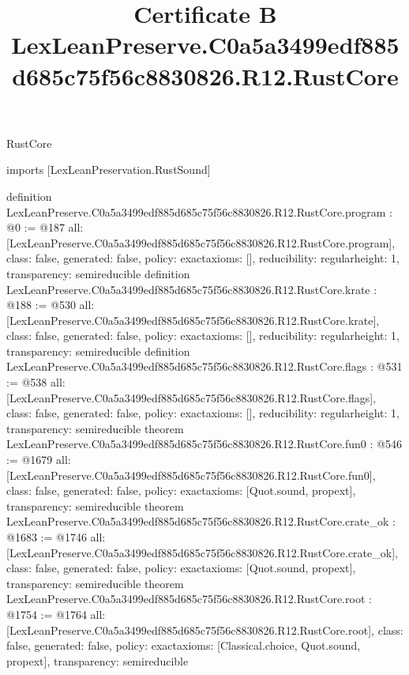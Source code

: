 \begin{lexlean}{RustCore}
\title{Certificate B LexLeanPreserve.C0a5a3499edf885d685c75f56c8830826.R12.RustCore}
\begin{coremodule}
imports [LexLeanPreservation.RustSound]

definition LexLeanPreserve.C0a5a3499edf885d685c75f56c8830826.R12.RustCore.program : @0 := @187 {
  all: [LexLeanPreserve.C0a5a3499edf885d685c75f56c8830826.R12.RustCore.program],
  class: false,
  generated: false,
  policy: exact{axioms: []},
  reducibility: regular{height: 1},
  transparency: semireducible
}
definition LexLeanPreserve.C0a5a3499edf885d685c75f56c8830826.R12.RustCore.krate : @188 := @530 {
  all: [LexLeanPreserve.C0a5a3499edf885d685c75f56c8830826.R12.RustCore.krate],
  class: false,
  generated: false,
  policy: exact{axioms: []},
  reducibility: regular{height: 1},
  transparency: semireducible
}
definition LexLeanPreserve.C0a5a3499edf885d685c75f56c8830826.R12.RustCore.flags : @531 := @538 {
  all: [LexLeanPreserve.C0a5a3499edf885d685c75f56c8830826.R12.RustCore.flags],
  class: false,
  generated: false,
  policy: exact{axioms: []},
  reducibility: regular{height: 1},
  transparency: semireducible
}
theorem LexLeanPreserve.C0a5a3499edf885d685c75f56c8830826.R12.RustCore.fun0 : @546 := @1679 {
  all: [LexLeanPreserve.C0a5a3499edf885d685c75f56c8830826.R12.RustCore.fun0],
  class: false,
  generated: false,
  policy: exact{axioms: [Quot.sound, propext]},
  transparency: semireducible
}
theorem LexLeanPreserve.C0a5a3499edf885d685c75f56c8830826.R12.RustCore.crate_ok : @1683 := @1746 {
  all: [LexLeanPreserve.C0a5a3499edf885d685c75f56c8830826.R12.RustCore.crate_ok],
  class: false,
  generated: false,
  policy: exact{axioms: [Quot.sound, propext]},
  transparency: semireducible
}
theorem LexLeanPreserve.C0a5a3499edf885d685c75f56c8830826.R12.RustCore.root : @1754 := @1764 {
  all: [LexLeanPreserve.C0a5a3499edf885d685c75f56c8830826.R12.RustCore.root],
  class: false,
  generated: false,
  policy: exact{axioms: [Classical.choice, Quot.sound, propext]},
  transparency: semireducible
}


\end{coremodule}
\end{lexlean}
